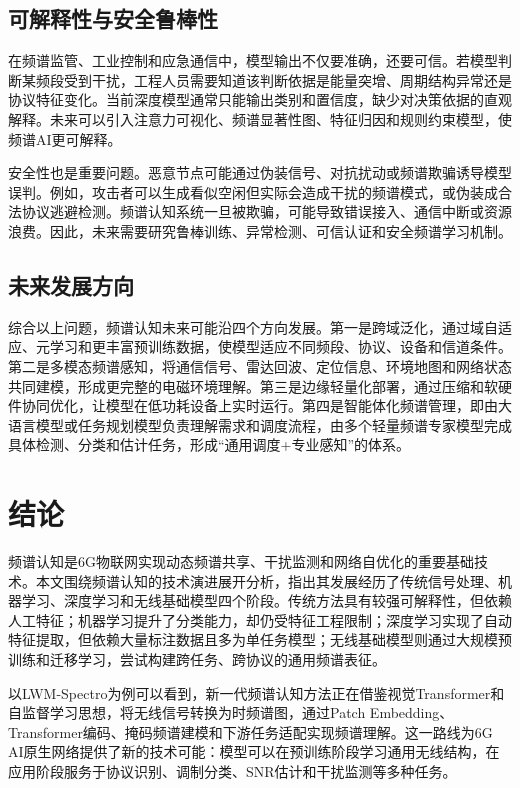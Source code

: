 \documentclass[UTF8,fontset=windows,zihao=-4]{ctexart}
\begin{document}
\subsection{可解释性与安全鲁棒性}
在频谱监管、工业控制和应急通信中，模型输出不仅要准确，还要可信。若模型判断某频段受到干扰，工程人员需要知道该判断依据是能量突增、周期结构异常还是协议特征变化。当前深度模型通常只能输出类别和置信度，缺少对决策依据的直观解释。未来可以引入注意力可视化、频谱显著性图、特征归因和规则约束模型，使频谱AI更可解释。

安全性也是重要问题。恶意节点可能通过伪装信号、对抗扰动或频谱欺骗诱导模型误判。例如，攻击者可以生成看似空闲但实际会造成干扰的频谱模式，或伪装成合法协议逃避检测。频谱认知系统一旦被欺骗，可能导致错误接入、通信中断或资源浪费。因此，未来需要研究鲁棒训练、异常检测、可信认证和安全频谱学习机制。

\subsection{未来发展方向}
综合以上问题，频谱认知未来可能沿四个方向发展。第一是跨域泛化，通过域自适应、元学习和更丰富预训练数据，使模型适应不同频段、协议、设备和信道条件。第二是多模态频谱感知，将通信信号、雷达回波、定位信息、环境地图和网络状态共同建模，形成更完整的电磁环境理解。第三是边缘轻量化部署，通过压缩和软硬件协同优化，让模型在低功耗设备上实时运行。第四是智能体化频谱管理，即由大语言模型或任务规划模型负责理解需求和调度流程，由多个轻量频谱专家模型完成具体检测、分类和估计任务，形成“通用调度+专业感知”的体系。

\clearpage
\section{结论}
频谱认知是6G物联网实现动态频谱共享、干扰监测和网络自优化的重要基础技术。本文围绕频谱认知的技术演进展开分析，指出其发展经历了传统信号处理、机器学习、深度学习和无线基础模型四个阶段。传统方法具有较强可解释性，但依赖人工特征；机器学习提升了分类能力，却仍受特征工程限制；深度学习实现了自动特征提取，但依赖大量标注数据且多为单任务模型；无线基础模型则通过大规模预训练和迁移学习，尝试构建跨任务、跨协议的通用频谱表征\cite{rf-gpt,wirelessgpt,lwm}。

以LWM-Spectro为例可以看到，新一代频谱认知方法正在借鉴视觉Transformer和自监督学习思想，将无线信号转换为时频谱图，通过Patch Embedding、Transformer编码、掩码频谱建模和下游任务适配实现频谱理解。这一路线为6G AI原生网络提供了新的技术可能：模型可以在预训练阶段学习通用无线结构，在应用阶段服务于协议识别、调制分类、SNR估计和干扰监测等多种任务。
\end{document}
